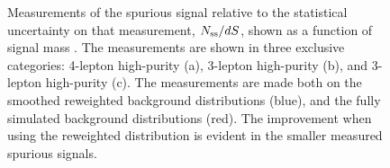 \begin{figure}[h!]
\captionsetup[subfigure]{position=b}
\centering
{}
\caption{Measurements of the spurious signal relative to the statistical uncertainty on that measurement, $N_\text{ss}/dS$, shown as a function of signal mass \muu. The measurements are shown in three exclusive categories: 4-lepton high-purity (a), 3-lepton high-purity (b), and 3-lepton high-purity (c). The measurements are made both on the smoothed reweighted background distributions (blue), and the fully simulated background distributions (red). The improvement when using the reweighted distribution is evident in the smaller measured spurious signals.}
\label{fig:hmmSsScan}
\end{figure}

